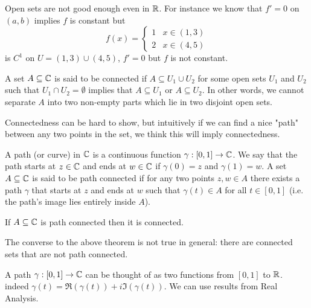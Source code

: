 \documentclass[10pt, a4paper]{article}
\begin{document}
Open sets are not good enough even in $\mathbb{R}$.
For instance we know that $f' = 0$ on $(a, b)$ implies $f$ is constant but
\[
f(x) = \begin{cases}
    1 & x \in (1, 3) \\
    2 & x \in (4, 5)
\end{cases}
\]
is $C ^ 1$ on $U = (1, 3) \cup (4, 5)$,
$f' = 0$ but $f$ is not constant.

\begin{definition}[Connectedness]
    A set $A \subseteq \mathbb{C}$ is said to be connected if $A \subseteq U_1 \cup U_2$ for some open sets $U_1$ and $U_2$ such that $U_1 \cap U_2 = \emptyset$ implies that $A \subseteq U_1$ or $A \subseteq U_2$.
    In other words,
    we cannot separate $A$ into two non-empty parts which lie in two disjoint open sets.
\end{definition}

Connectedness can be hard to show,
but intuitively if we can find a nice "path" between any two points in the set,
we think this will imply connectedness.

\begin{definition}
    A path
    (or curve)
    in $\mathbb{C}$ is a continuous function $\gamma : [0, 1] \to \mathbb{C}$.
    We say that the path starts at $z \in \mathbb{C}$ and ends at $w \in \mathbb{C}$ if $\gamma(0) = z$ and $\gamma(1) = w$.
    A set $A \subseteq \mathbb{C}$ is said to be path connected if for any two points $z, w \in A$ there exists a path $\gamma$ that starts at $z$ and ends at $w$ such that $\gamma(t) \in A$ for all $t \in [0, 1]$
    (i.e. the path's image lies entirely inside $A$).
\end{definition}

\begin{theorem}
    If $A \subseteq \mathbb{C}$ is path connected then it is connected.
\end{theorem}

\begin{remark}
    The converse to the above theorem is not true in general:
    there are connected sets that are not path connected.
\end{remark}

A path $\gamma : [0, 1] \to \mathbb{C}$ can be thought of as two functions from $[0, 1]$ to $\mathbb{R}$.
indeed $\gamma(t) = \Re(\gamma(t)) + i\Im(\gamma(t))$.
We can use results from Real Analysis.
\end{document}
